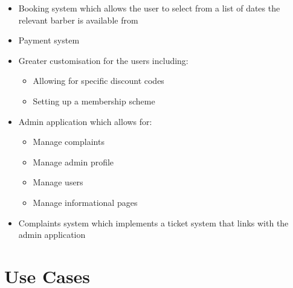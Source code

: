 \documentclass[12pt]{article}
\begin{document}
	\begin{itemize}
		\item Booking system which allows the user to select from a list of dates the relevant barber is available from
		\item Payment system
		\item Greater customisation for the users including:
		\begin{itemize}
			\item Allowing for specific discount codes
			\item Setting up a membership scheme
		\end{itemize}
		\item Admin application which allows for:
		\begin{itemize}
			\item Manage complaints
			\item Manage admin profile
			\item Manage users
			\item Manage informational pages
		\end{itemize}
		\item Complaints system which implements a ticket system that links with the admin application
	\end{itemize}
	
	
	\pagebreak
	\printbibliography
	\pagebreak
	
	\appendix
	\appendixpage
	\section{Use Cases}
	\label{chap:use-cases}
		
\end{document}

